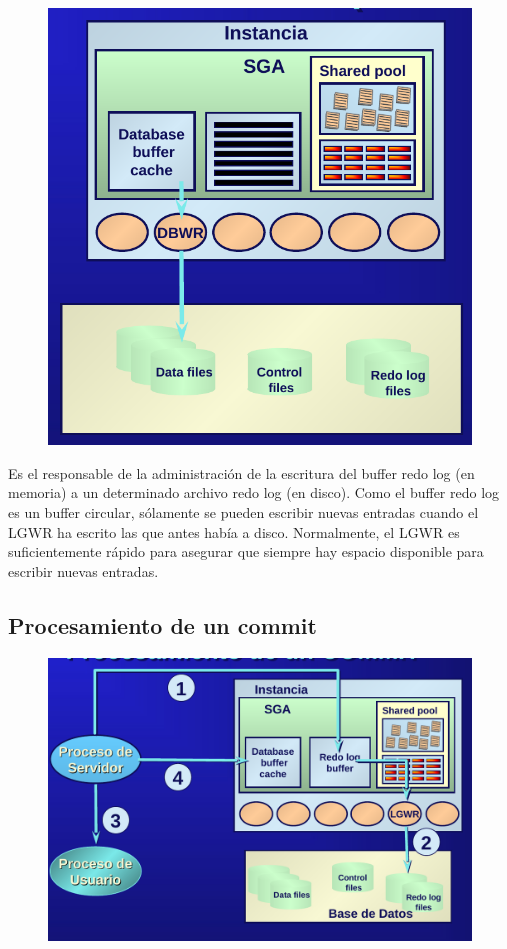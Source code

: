 \begin{figure}[H]
  \center
  \includegraphics[scale=0.2]{img/p9.png}
\end{figure}

Es el responsable de la administración de la escritura del buffer redo log (en memoria) a un determinado archivo redo log (en disco). Como el buffer redo log es un buffer circular, sólamente  se pueden escribir nuevas entradas cuando el LGWR ha escrito las que antes había a disco. Normalmente, el LGWR es suficientemente rápido para asegurar que siempre hay espacio disponible para escribir nuevas entradas.

\subsection{Procesamiento de un commit}

\begin{figure}[H]
  \center
  \includegraphics[scale=0.2]{img/p8.png}
\end{figure}

